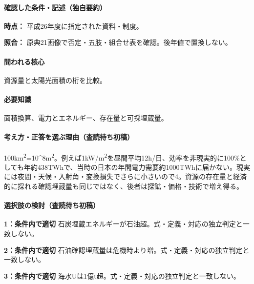 \paragraph{確認した条件・記述（独自要約）}\mbox{}\par

\noindent\textbf{時点：} 平成26年度に指定された資料・制度。\par

\noindent\textbf{照合：} 原典21画像で否定・五肢・組合せ表を確認。後年値で置換しない。\par

\paragraph{問われる核心} 資源量と太陽光面積の桁を比較。

\paragraph{必要知識} 面積換算、電力とエネルギー、存在量と可採埋蔵量。

\paragraph{考え方・正答を選ぶ理由（査読待ち初稿）} 100km\textsuperscript{2}=10\textasciicircum{}8m\textsuperscript{2}。例えば1kW/m\textsuperscript{2}を昼間平均12h/日、効率を非現実的に100\%としても年約438TWhで、当時の日本の年間電力需要約1000TWhに届かない。現実には夜間・天候・入射角・変換損失でさらに小さいので4。資源の存在量と経済的に採れる確認埋蔵量も同じではなく、後者は探鉱・価格・技術で増え得る。

\paragraph{選択肢の検討（査読待ち初稿）}\mbox{}\par

\noindent\textbf{1：条件内で適切} 石炭埋蔵エネルギーが石油超。式・定義・対応の独立判定と一致しない。\par

\noindent\textbf{2：条件内で適切} 石油確認埋蔵量は危機時より増。式・定義・対応の独立判定と一致しない。\par

\noindent\textbf{3：条件内で適切} 海水Uは1億t超。式・定義・対応の独立判定と一致しない。\par

